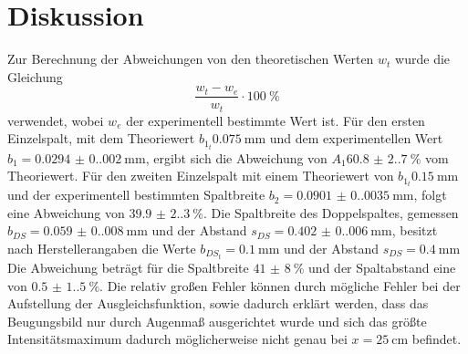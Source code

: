 \section{Diskussion}

Zur Berechnung der Abweichungen von den theoretischen Werten $w_t$ wurde die Gleichung 
\begin{equation}
    \frac{w_t-w_e}{w_t}\cdot \qty{100}{\percent}
    \label{eqn:ABweichung}
\end{equation}
\noindent verwendet, 
wobei $w_e$ der experimentell bestimmte Wert ist. Für den ersten Einzelspalt, mit dem Theoriewert $b_{1_t}\qty{0.075}{\milli\meter}$
und dem experimentellen Wert $b_1=\qty{0.0294(0.0020)}{\milli\meter}$, ergibt sich die Abweichung von $A_1\qty{60.8(2.7)}{\percent}$ vom Theoriewert. 
Für den zweiten Einzelspalt mit einem Theoriewert von $b_{1_t}\qty{0.15}{\milli\meter}$ und der experimentell bestimmten Spaltbreite $b_2=\qty{0.0901(0.0035)}{\milli\meter}$, folgt eine Abweichung von $\qty{39.9(2.3)}{\percent}$.
Die Spaltbreite des Doppelspaltes, gemessen $b_{DS}=\qty{0.059(0.008)}{\milli\meter}$ und der Abstand $s_{DS}=\qty{0.402(0.006)}{\milli\meter}$, 
besitzt nach Herstellerangaben die Werte $b_{DS_t}=\qty{0.1}{\milli\meter}$ und der Abstand $s_{DS}=\qty{0.4}{\milli\meter}$
Die Abweichung beträgt für die Spaltbreite $\qty{41(8)}{\percent}$ und der Spaltabstand eine von $\qty{0.5(1.5)}{\percent}$.
Die relativ großen Fehler können durch mögliche Fehler bei der Aufstellung der Ausgleichsfunktion, sowie dadurch erklärt werden, dass das Beugungsbild nur durch Augenmaß ausgerichtet
wurde und sich das größte Intensitätsmaximum dadurch möglicherweise nicht genau bei $x=\qty{25}{\centi\meter}$ befindet.

\label{sec:Diskussion}
